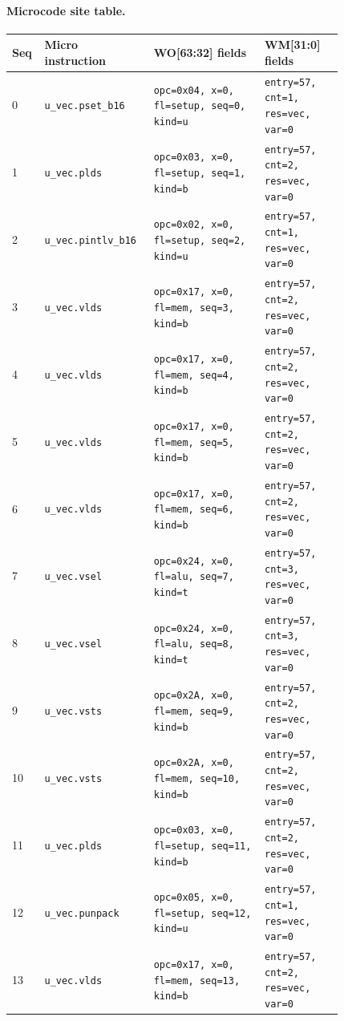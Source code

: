 \paragraph{Microcode site table.}
{\scriptsize
\begin{longtable}{@{}R{0.055\linewidth}L{0.23\linewidth}L{0.31\linewidth}L{0.22\linewidth}@{}}
\toprule
Seq & Micro instruction & WO[63:32] fields & WM[31:0] fields \\
 & \texttt{u\_vec.pset\_b16} & \texttt{opc=0x04, x=0, fl=setup, seq=0, kind=u} & \texttt{entry=57, cnt=1, res=vec, var=0} \\
1 & \texttt{u\_vec.plds} & \texttt{opc=0x03, x=0, fl=setup, seq=1, kind=b} & \texttt{entry=57, cnt=2, res=vec, var=0} \\
2 & \texttt{u\_vec.pintlv\_b16} & \texttt{opc=0x02, x=0, fl=setup, seq=2, kind=u} & \texttt{entry=57, cnt=1, res=vec, var=0} \\
3 & \texttt{u\_vec.vlds} & \texttt{opc=0x17, x=0, fl=mem, seq=3, kind=b} & \texttt{entry=57, cnt=2, res=vec, var=0} \\
4 & \texttt{u\_vec.vlds} & \texttt{opc=0x17, x=0, fl=mem, seq=4, kind=b} & \texttt{entry=57, cnt=2, res=vec, var=0} \\
5 & \texttt{u\_vec.vlds} & \texttt{opc=0x17, x=0, fl=mem, seq=5, kind=b} & \texttt{entry=57, cnt=2, res=vec, var=0} \\
6 & \texttt{u\_vec.vlds} & \texttt{opc=0x17, x=0, fl=mem, seq=6, kind=b} & \texttt{entry=57, cnt=2, res=vec, var=0} \\
7 & \texttt{u\_vec.vsel} & \texttt{opc=0x24, x=0, fl=alu, seq=7, kind=t} & \texttt{entry=57, cnt=3, res=vec, var=0} \\
8 & \texttt{u\_vec.vsel} & \texttt{opc=0x24, x=0, fl=alu, seq=8, kind=t} & \texttt{entry=57, cnt=3, res=vec, var=0} \\
9 & \texttt{u\_vec.vsts} & \texttt{opc=0x2A, x=0, fl=mem, seq=9, kind=b} & \texttt{entry=57, cnt=2, res=vec, var=0} \\
10 & \texttt{u\_vec.vsts} & \texttt{opc=0x2A, x=0, fl=mem, seq=10, kind=b} & \texttt{entry=57, cnt=2, res=vec, var=0} \\
11 & \texttt{u\_vec.plds} & \texttt{opc=0x03, x=0, fl=setup, seq=11, kind=b} & \texttt{entry=57, cnt=2, res=vec, var=0} \\
12 & \texttt{u\_vec.punpack} & \texttt{opc=0x05, x=0, fl=setup, seq=12, kind=u} & \texttt{entry=57, cnt=1, res=vec, var=0} \\
13 & \texttt{u\_vec.vlds} & \texttt{opc=0x17, x=0, fl=mem, seq=13, kind=b} & \texttt{entry=57, cnt=2, res=vec, var=0} \\

\end{longtable}}
